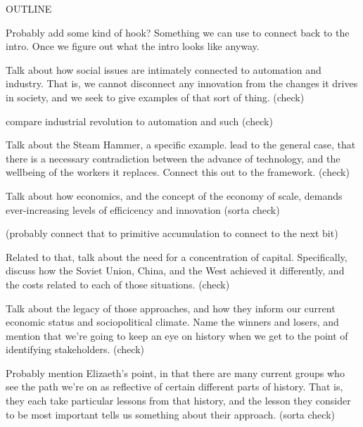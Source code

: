 

{\large OUTLINE}

Probably add some kind of hook?  Something we can use to connect 
back to the intro.  Once we figure out what the intro looks like 
anyway.

Talk about how social issues are intimately connected to automation 
and industry.  That is, we cannot disconnect any innovation from the 
changes it drives in society, and we seek to give examples of that sort 
of thing. (check)

compare industrial revolution to automation and such (check)

Talk about the Steam Hammer, a specific example.  lead to the general 
case, that there is a necessary contradiction between the advance of 
technology, and the wellbeing of the workers it replaces.  Connect 
this out to the framework. (check)

Talk about how economics, and the concept of the economy of scale, 
demands ever-increasing levels of efficicency and innovation (sorta check)

(probably connect that to primitive accumulation to connect to the next bit)

Related to that, talk about the need for a concentration of capital.  
Specifically, discuss how the Soviet Union, China, and the 
West achieved it differently, and the costs related to each of those 
situations. (check)

Talk about the legacy of those approaches, and how they inform our 
current economic status and sociopolitical climate.  Name the winners 
and losers, and mention that we're going to keep an eye on history when 
we get to the point of identifying stakeholders.  (check)

Probably mention 
Elizaeth's point, in that there are many current groups who see the 
path we're on as reflective of certain different parts of history.  
That is, they each take particular lessons from that history, and 
the lesson they consider to be most important tells us something 
about their approach. (sorta check)